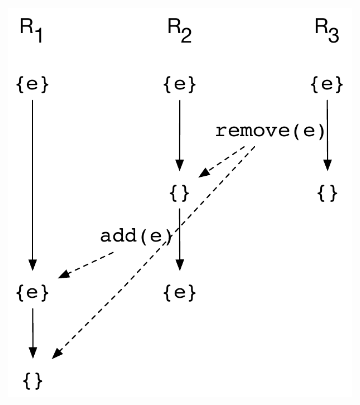 \begin{figure}[ht]
  \centering
  \begin{subfigure}[t]{0.55\columnwidth}
    \includegraphics[scale=0.35]{Figures/crdt-execs-1}
    \caption{}
    \label{fig:crdt-execs-1}
  \end{subfigure}
  \begin{subfigure}[t]{0.44\columnwidth}

\end{subfigure}
\end{figure}
